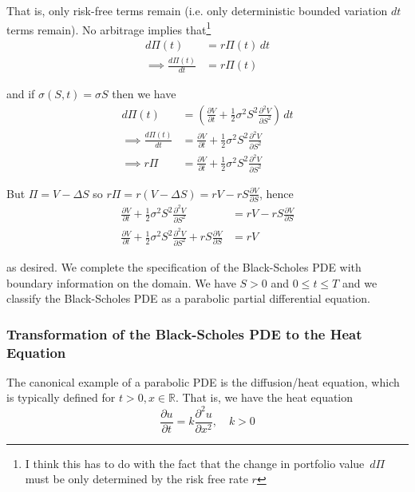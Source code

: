 \documentclass[12pt]{article}
\newlength\tindent
\renewcommand{\indent}{\hspace*{\tindent}}
\newcommand{\R}{\mathbb R}
\begin{document}
\indent That is, only risk-free terms remain (i.e. only deterministic bounded variation $dt$ terms remain). No arbitrage implies that\footnote{I think this has to do with the fact that the change in portfolio value $\,d\Pi$ must be only determined by the risk free rate $r$}
\begin{align*}
	d\Pi(t) &= r\Pi(t)\,dt \\
	\implies \frac{ d\Pi(t) }{ dt } &= r\Pi(t)
\end{align*}

and if $\sigma(S, t) = \sigma S$ then we have
\begin{align*}
	d\Pi(t) &= \left( \frac{ \partial V }{ \partial t } + \frac{1}{2}\sigma^2S^2\frac{ \partial^2 V }{ \partial S^2 } \right)\,dt \\
	\implies \frac{d\Pi(t)}{dt} &= \frac{ \partial V }{ \partial t } + \frac{1}{2}\sigma^2S^2\frac{ \partial^2 V }{ \partial S^2 } \\
	\implies	 r\Pi &= \frac{ \partial V }{ \partial t } + \frac{1}{2}\sigma^2S^2\frac{ \partial^2 V }{ \partial S^2 }
\end{align*}

But $\Pi = V - \Delta S$ so $r\Pi = r \left( V - \Delta S \right) = rV - rS\frac{ \partial V }{ \partial S }$, hence
\begin{align*}
	\frac{ \partial V }{ \partial t } + \frac{1}{2}\sigma^2S^2\frac{ \partial^2 V }{ \partial S^2 } &= rV - rS\frac{ \partial V }{ \partial S } \\
	\frac{ \partial V }{ \partial t } + \frac{1}{2}\sigma^2 S^2 \frac{ \partial^2 V }{ \partial S^2 } + rS \frac{ \partial V }{ \partial S } &= rV
\end{align*}

as desired. We complete the specification of the Black-Scholes PDE with boundary information on the domain. We have $S > 0$ and $0 \leq t \leq T$ and we classify the Black-Scholes PDE as a parabolic partial differential equation.

\subsubsection{Transformation of the Black-Scholes PDE to the Heat Equation}

\indent The canonical example of a parabolic PDE is the diffusion/heat equation, which is typically defined for $t > 0, x \in \R$. That is, we have the heat equation
\begin{equation*}
	\frac{ \partial u }{ \partial t } = k \frac{ \partial^2 u }{ \partial x^2 }, \quad k > 0
\end{equation*}
\end{document}

